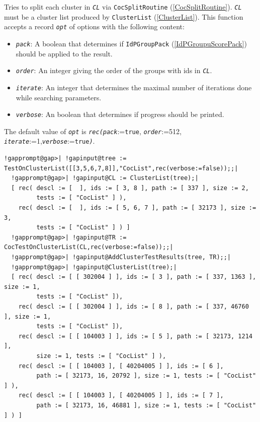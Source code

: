 \documentclass[a4paper,11pt]{report}
\begin{document}
{{{ Tries to split each cluster in \mbox{\texttt{\mdseries\slshape CL}} via \texttt{CocSplitRoutine} (\ref{CocSplitRoutine}). \mbox{\texttt{\mdseries\slshape CL}} must be a cluster list produced by \texttt{ClusterList} (\ref{ClusterList}). This function accepts a record \mbox{\texttt{\mdseries\slshape opt}} of options with the following content: 
\begin{itemize}
\item  \mbox{\texttt{\mdseries\slshape pack}}: A boolean that determines if \texttt{IdPGroup{\textunderscore}Pack} (\ref{IdPGroupuScorePack}) should be applied to the result. 
\item  \mbox{\texttt{\mdseries\slshape order}}: An integer giving the order of the groups with ids in \mbox{\texttt{\mdseries\slshape CL}}. 
\item  \mbox{\texttt{\mdseries\slshape iterate}}: An integer that determines the maximal number of iterations done while
searching parameters. 
\item  \mbox{\texttt{\mdseries\slshape verbose}}: An boolean that determines if progress should be printed. 
\end{itemize}
 The default value of \mbox{\texttt{\mdseries\slshape opt}} is \mbox{\texttt{\mdseries\slshape rec(pack}}:=\texttt{true}, \mbox{\texttt{\mdseries\slshape order}}:=512, \mbox{\texttt{\mdseries\slshape iterate}}:=1,\mbox{\texttt{\mdseries\slshape verbose}}:=\texttt{true}\mbox{\texttt{\mdseries\slshape )}}. 
\begin{Verbatim}[commandchars=!@|,fontsize=\small,frame=single,label=Example]
  !gapprompt@gap>| !gapinput@tree := TestOnClusterList([[3,5,6,7,8]],"CocList",rec(verbose:=false));;|
  !gapprompt@gap>| !gapinput@CL := ClusterList(tree);|
  [ rec( descl := [  ], ids := [ 3, 8 ], path := [ 337 ], size := 2,
         tests := [ "CocList" ] ),
    rec( descl := [  ], ids := [ 5, 6, 7 ], path := [ 32173 ], size := 3,
         tests := [ "CocList" ] ) ]
  !gapprompt@gap>| !gapinput@TR := CocTestOnClusterList(CL,rec(verbose:=false));;|
  !gapprompt@gap>| !gapinput@AddClusterTestResults(tree, TR);;|
  !gapprompt@gap>| !gapinput@ClusterList(tree);|
  [ rec( descl := [ [ 302004 ] ], ids := [ 3 ], path := [ 337, 1363 ], size := 1,
         tests := [ "CocList" ]),
    rec( descl := [ [ 302004 ] ], ids := [ 8 ], path := [ 337, 46760 ], size := 1,
         tests := [ "CocList" ]),
    rec( descl := [ [ 104003 ] ], ids := [ 5 ], path := [ 32173, 1214 ],
         size := 1, tests := [ "CocList" ] ),
    rec( descl := [ [ 104003 ], [ 40204005 ] ], ids := [ 6 ],
         path := [ 32173, 16, 20792 ], size := 1, tests := [ "CocList" ] ),
    rec( descl := [ [ 104003 ], [ 40204005 ] ], ids := [ 7 ],
         path := [ 32173, 16, 46881 ], size := 1, tests := [ "CocList" ] ) ]
\end{Verbatim}
 }

}}
\end{document}
